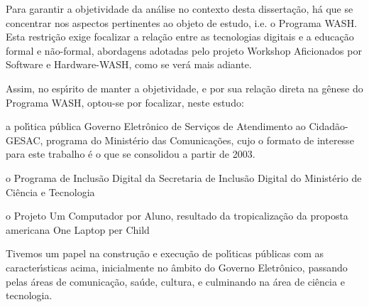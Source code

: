 \documentclass[
12pt,		%
openright,	%
twoside,  %
a4paper,			%
chapter=TITLE,		%
english,			%
french,				%
spanish,			%
brazil				%
]{USPSC-classe/USPSC}
\begin{document}
Para garantir a objetividade da an\'alise no contexto desta disserta\c{c}\~ao, h\'a que se concentrar nos aspectos pertinentes ao objeto de estudo, i.e. o Programa WASH. Esta restri\c{c}\~ao exige focalizar a rela\c{c}\~ao entre as tecnologias digitais e a educa\c{c}\~ao formal e n\~ao-formal, abordagens adotadas pelo projeto Workshop Aficionados por Software e Hardware-WASH, como se ver\'a mais adiante.

















Assim, no esp\'{\i}rito de manter a objetividade, e por sua rela\c{c}\~ao direta na g\^enese do Programa WASH, optou-se por focalizar, neste estudo:


















\begin{alineas}
\item a pol\'{\i}tica p\'ublica \textquotedbl Governo Eletr\^onico de Servi\c{c}os de Atendimento ao Cidad\~ao-GESAC\textquotedbl , programa do Minist\'erio das Comunica\c{c}\~oes, cujo o formato de interesse para este trabalho \'e o que se consolidou a partir de 2003.
\item o Programa de Inclus\~ao Digital da Secretaria de Inclus\~ao Digital do Minist\'erio de Ci\^encia e Tecnologia
\item o Projeto Um Computador por Aluno, resultado da tropicaliza\c{c}\~ao da proposta americana \textquotedbl One Laptop per Child\textquotedbl 
\end{alineas}

Tivemos um papel na constru\c{c}\~ao e execu\c{c}\~ao de pol\'{\i}ticas p\'ublicas com as caracter\'{\i}sticas acima, inicialmente no \^ambito do Governo Eletr\^onico, passando pelas \'areas de comunica\c{c}\~ao, sa\'ude, cultura, e culminando na \'area de ci\^encia e tecnologia.
\end{document}
